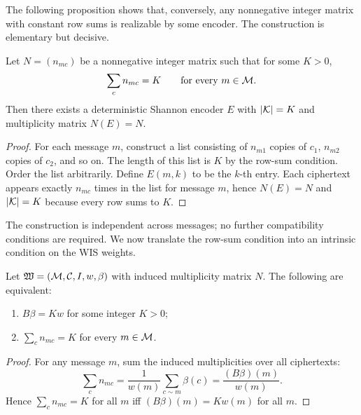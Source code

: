 The following proposition shows that, conversely, any nonnegative
integer matrix with constant row sums is realizable by some encoder.
The construction is elementary but decisive.
\begin{proposition}\label{ch:prop:matrix-realization}
Let $N=(n_{mc})$ be a nonnegative integer matrix such that for some $K>0$,
\[
\sum_{c} n_{mc}=K \qquad\text{for every } m\in\mathcal{M}.
\]
Then there exists a deterministic Shannon encoder $E$ with $|\mathcal{K}|=K$ and
multiplicity matrix $N(E)=N$.
\end{proposition}
\begin{proof}
For each message $m$, construct a list consisting of $n_{m1}$ copies of
$c_1$, $n_{m2}$ copies of $c_2$, and so on.  The length of this list is
$K$ by the row-sum condition.  Order the list arbitrarily.  Define
$E(m,k)$ to be the $k$-th entry.  Each ciphertext appears exactly
$n_{mc}$ times in the list for message $m$, hence $N(E)=N$ and
$|\mathcal{K}|=K$ because every row sums to $K$.
\end{proof}

The construction is independent across messages; no further compatibility
conditions are required.
We now translate the row-sum condition into an intrinsic condition on
the WIS weights.
\begin{lemma}\label{ch:lem:balance-equivalence}
Let $\mathfrak W=(\mathcal{M},\mathcal{C},I,w,\beta)$ with induced multiplicity matrix
$N$.  The following are equivalent:
\begin{enumerate}
\item $B\beta = K w$ for some integer $K>0$;
\item $\displaystyle\sum_{c} n_{mc}=K$ for every $m\in\mathcal{M}$.
\end{enumerate}
\end{lemma}
\begin{proof}
For any message $m$, sum the induced multiplicities over all ciphertexts:
\[
\sum_{c} n_{mc}
= \frac{1}{w(m)}\sum_{c\sim m} \beta(c)
= \frac{(B\beta)(m)}{w(m)}.
\]
Hence $\sum_c n_{mc}=K$ for all $m$ iff $(B\beta)(m)=K w(m)$ for all $m$.
\end{proof}

